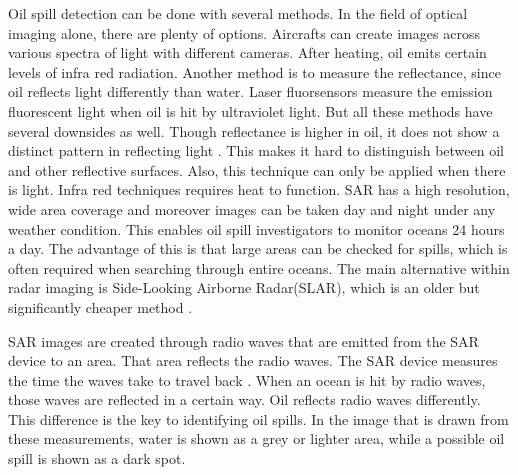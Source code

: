 Oil spill detection can be done with several methods. In the field of optical imaging alone, there are plenty of options. Aircrafts can create images across various spectra of light with different cameras. After heating, oil emits certain levels of infra red radiation. Another method is to measure the reflectance, since oil reflects light differently than water. Laser fluorsensors measure the emission fluorescent light when oil is hit by ultraviolet light. But all these methods have several downsides as well. Though reflectance is higher in oil, it does not show a distinct pattern in reflecting light \cite{fingas2014review}. This makes it hard to distinguish between oil and other reflective surfaces. Also, this technique can only be applied when there is light. Infra red techniques requires heat to function.
SAR has a high resolution, wide area coverage and moreover images can be taken day and night under any weather condition. This enables oil spill investigators to monitor oceans 24 hours a day\cite{Chang20081915}. The advantage of this is that large areas can be checked for spills, which is often required when searching through entire oceans. 
The main alternative within radar imaging is Side-Looking Airborne Radar(SLAR), which is an older but significantly cheaper method \cite{fingas2014review}. 

SAR images are created through radio waves that are emitted from the SAR device to an area. That area reflects the radio waves. The SAR device measures the time the waves take to travel back  \cite{Doerry:04}. When an ocean is hit by radio waves, those waves are reflected in a certain way. Oil reflects radio waves differently. This difference is the key to identifying oil spills.
In the image that is drawn from these measurements, water is shown as a grey or lighter area, while a possible oil spill is shown as a dark spot.







